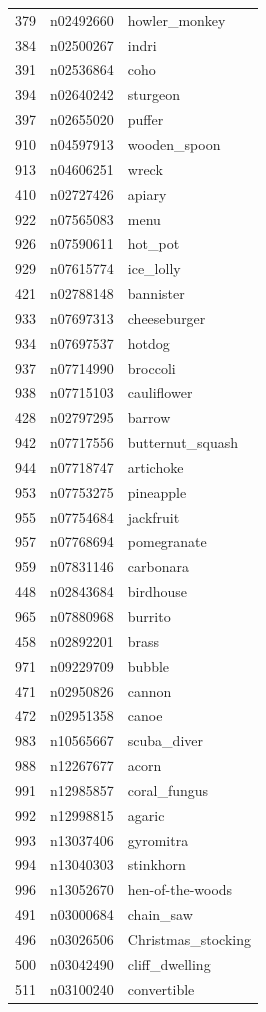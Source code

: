\begin{table}
\begin{tabular}{cll}
379 & n02492660 & howler_monkey \\
384 & n02500267 & indri \\
391 & n02536864 & coho \\
394 & n02640242 & sturgeon \\
397 & n02655020 & puffer \\
910 & n04597913 & wooden_spoon \\
913 & n04606251 & wreck \\
410 & n02727426 & apiary \\
922 & n07565083 & menu \\
926 & n07590611 & hot_pot \\
929 & n07615774 & ice_lolly \\
421 & n02788148 & bannister \\
933 & n07697313 & cheeseburger \\
934 & n07697537 & hotdog \\
937 & n07714990 & broccoli \\
938 & n07715103 & cauliflower \\
428 & n02797295 & barrow \\
942 & n07717556 & butternut_squash \\
944 & n07718747 & artichoke \\
953 & n07753275 & pineapple \\
955 & n07754684 & jackfruit \\
957 & n07768694 & pomegranate \\
959 & n07831146 & carbonara \\
448 & n02843684 & birdhouse \\
965 & n07880968 & burrito \\
458 & n02892201 & brass \\
971 & n09229709 & bubble \\
471 & n02950826 & cannon \\
472 & n02951358 & canoe \\
983 & n10565667 & scuba_diver \\
988 & n12267677 & acorn \\
991 & n12985857 & coral_fungus \\
992 & n12998815 & agaric \\
993 & n13037406 & gyromitra \\
994 & n13040303 & stinkhorn \\
996 & n13052670 & hen-of-the-woods \\
491 & n03000684 & chain_saw \\
496 & n03026506 & Christmas_stocking \\
500 & n03042490 & cliff_dwelling \\
511 & n03100240 & convertible \\
\bottomrule
\end{tabular}
\end{table}
